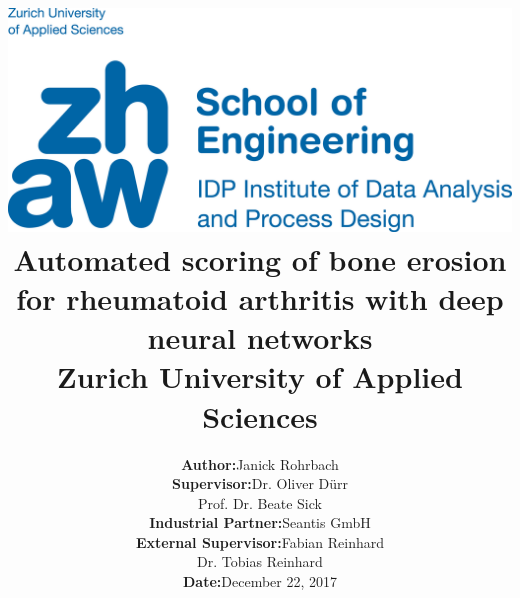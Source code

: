 \documentclass[12pt]{article}
\begin{document}
\title{
\vspace{-2.0cm}
\includegraphics{zhaw}\\ 
\vspace{3cm}
Automated scoring of bone erosion for rheumatoid arthritis with deep neural networks\\
{\Large Zurich University of Applied Sciences}}
\author{\begin{tabular}{rl}
  \textbf{Author:} & Janick Rohrbach \\
  \textbf{Supervisor:} & Dr. Oliver Dürr \\ & Prof. Dr. Beate Sick \\
  \textbf{Industrial Partner:} & Seantis GmbH \\
  \textbf{External Supervisor:} & Fabian Reinhard \\ & Dr. Tobias Reinhard \\
  \textbf{Date:} & December 22, 2017 \\
  \hspace{6.0cm} & \hspace{6.0cm}
\end{tabular}}
\date{}
\maketitle

\newpage
\end{document}

